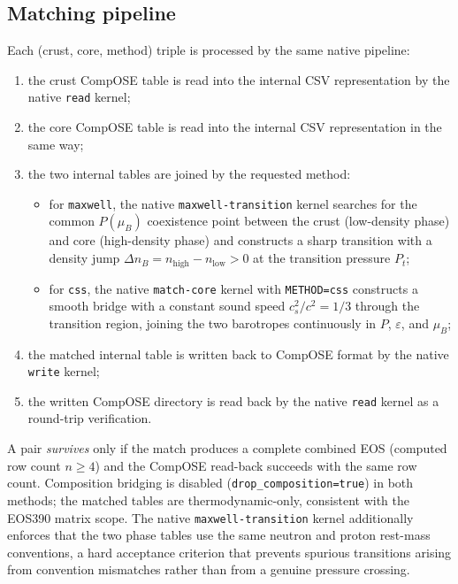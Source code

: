 \documentclass[aps,prc,reprint,notitlepage]{revtex4-2}
\begin{document}
\subsection{Matching pipeline}

Each (crust, core, method) triple is processed by the same native
pipeline:
\begin{enumerate}
    \item the crust CompOSE table is read into the internal CSV
          representation by the native \texttt{read} kernel;
    \item the core CompOSE table is read into the internal CSV
          representation in the same way;
    \item the two internal tables are joined by the requested method:
          \begin{itemize}
              \item for \texttt{maxwell}, the native
                    \texttt{maxwell-transition} kernel searches for the
                    common $P(\mu_B)$ coexistence point between the crust
                    (low-density phase) and core (high-density phase) and
                    constructs a sharp transition with a density jump
                    $\Delta n_B = n_{\mathrm{high}} - n_{\mathrm{low}} > 0$
                    at the transition pressure $P_t$;
              \item for \texttt{css}, the native \texttt{match-core} kernel
                    with \texttt{METHOD=css} constructs a smooth bridge with
                    a constant sound speed $c_s^2/c^2 = 1/3$ through the
                    transition region, joining the two barotropes
                    continuously in $P$, $\varepsilon$, and $\mu_B$;
          \end{itemize}
    \item the matched internal table is written back to CompOSE format by
          the native \texttt{write} kernel;
    \item the written CompOSE directory is read back by the native
          \texttt{read} kernel as a round-trip verification.
\end{enumerate}
A pair \emph{survives} only if the match produces a complete combined EOS
(computed row count $n \ge 4$) and the CompOSE read-back succeeds with the
same row count.  Composition bridging is disabled
(\texttt{drop\_composition=true}) in both methods; the matched tables are
thermodynamic-only, consistent with the EOS390 matrix scope.  The native
\texttt{maxwell-transition} kernel additionally enforces that the two phase
tables use the same neutron and proton rest-mass conventions, a hard
acceptance criterion that prevents spurious transitions arising from
convention mismatches rather than from a genuine pressure crossing.
\end{document}
